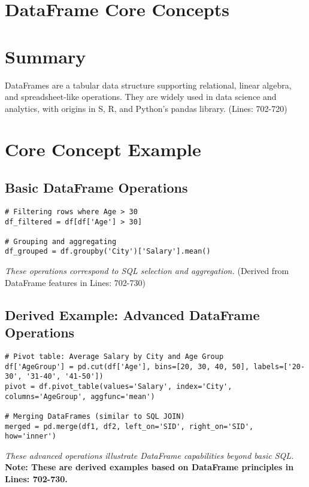 \documentclass{article}
\begin{document}
\section*{DataFrame Core Concepts}

\section*{Summary}
DataFrames are a tabular data structure supporting relational, linear algebra, and spreadsheet-like operations. They are widely used in data science and analytics, with origins in S, R, and Python's pandas library. (Lines: 702-720)

\section*{Core Concept Example}

\subsection*{Basic DataFrame Operations}
\begin{verbatim}
# Filtering rows where Age > 30
df_filtered = df[df['Age'] > 30]

# Grouping and aggregating
df_grouped = df.groupby('City')['Salary'].mean()
\end{verbatim}
\textit{These operations correspond to SQL selection and aggregation.} (Derived from DataFrame features in Lines: 702-730)

\subsection*{Derived Example: Advanced DataFrame Operations}
\begin{verbatim}
# Pivot table: Average Salary by City and Age Group
df['AgeGroup'] = pd.cut(df['Age'], bins=[20, 30, 40, 50], labels=['20-30', '31-40', '41-50'])
pivot = df.pivot_table(values='Salary', index='City', columns='AgeGroup', aggfunc='mean')

# Merging DataFrames (similar to SQL JOIN)
merged = pd.merge(df1, df2, left_on='SID', right_on='SID', how='inner')
\end{verbatim}
\textit{These advanced operations illustrate DataFrame capabilities beyond basic SQL.}
\textbf{Note: These are derived examples based on DataFrame principles in Lines: 702-730.}
\end{document}
